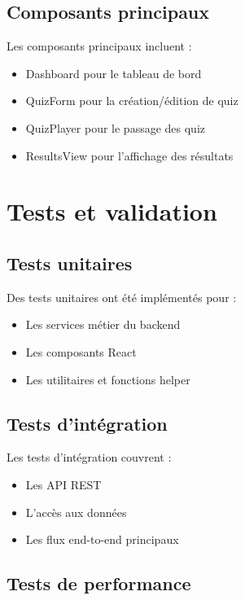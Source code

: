 \documentclass[12pt,a4paper]{report}
\begin{document}
\subsection{Composants principaux}

Les composants principaux incluent :

\begin{itemize}
    \item Dashboard pour le tableau de bord
    \item QuizForm pour la création/édition de quiz
    \item QuizPlayer pour le passage des quiz
    \item ResultsView pour l'affichage des résultats
\end{itemize}

\section{Tests et validation}

\subsection{Tests unitaires}

Des tests unitaires ont été implémentés pour :

\begin{itemize}
    \item Les services métier du backend
    \item Les composants React
    \item Les utilitaires et fonctions helper
\end{itemize}

\subsection{Tests d'intégration}

Les tests d'intégration couvrent :

\begin{itemize}
    \item Les API REST
    \item L'accès aux données
    \item Les flux end-to-end principaux
\end{itemize}

\subsection{Tests de performance}
\end{document}
